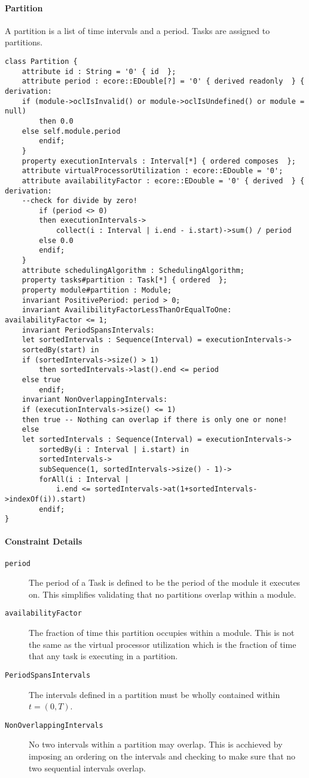 \paragraph{Partition}
A partition is a list of time intervals and a period. Tasks are assigned to partitions.
\begin{lstlisting}[caption=Partition constraints]
class Partition {
    attribute id : String = '0' { id  };
    attribute period : ecore::EDouble[?] = '0' { derived readonly  } {
derivation:
    if (module->oclIsInvalid() or module->oclIsUndefined() or module = null)
        then 0.0
    else self.module.period
        endif;
    }
    property executionIntervals : Interval[*] { ordered composes  };
    attribute virtualProcessorUtilization : ecore::EDouble = '0';
    attribute availabilityFactor : ecore::EDouble = '0' { derived  } { derivation:
    --check for divide by zero!
        if (period <> 0)
        then executionIntervals->
            collect(i : Interval | i.end - i.start)->sum() / period
        else 0.0
        endif;
    }
    attribute schedulingAlgorithm : SchedulingAlgorithm;
    property tasks#partition : Task[*] { ordered  };
    property module#partition : Module;
    invariant PositivePeriod: period > 0;
    invariant AvailibilityFactorLessThanOrEqualToOne: availabilityFactor <= 1;
    invariant PeriodSpansIntervals:
    let sortedIntervals : Sequence(Interval) = executionIntervals->
    sortedBy(start) in
    if (sortedIntervals->size() > 1)
        then sortedIntervals->last().end <= period
    else true
        endif;
    invariant NonOverlappingIntervals:
    if (executionIntervals->size() <= 1)
    then true -- Nothing can overlap if there is only one or none!
    else
    let sortedIntervals : Sequence(Interval) = executionIntervals->
        sortedBy(i : Interval | i.start) in
        sortedIntervals->
        subSequence(1, sortedIntervals->size() - 1)->
        forAll(i : Interval |
            i.end <= sortedIntervals->at(1+sortedIntervals->indexOf(i)).start)
        endif;
}
\end{lstlisting}
\paragraph{Constraint Details}
\begin{description}
\item[\texttt{period}] The period of a Task is defined to be the period of the module it executes on.
This simplifies validating that no partitions overlap within a module.
\item[\texttt{availabilityFactor}] The fraction of time this partition occupies within a module. This
is not the same as the virtual processor utilization which is the fraction of time that any task
is executing in a partition.
\item[\texttt{PeriodSpansIntervals}] The intervals defined in a partition must be wholly contained
within $t = (0,T)$. 
\item[\texttt{NonOverlappingIntervals}] No two intervals within a partition may overlap. This is
acchieved by imposing an ordering on the intervals and checking to make sure that
no two sequential intervals overlap.
\end{description}
